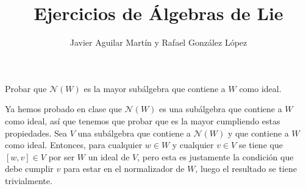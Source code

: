 \documentclass[twoside]{article}
\begin{document}
\title{Ejercicios de Álgebras de Lie}
\author{Javier Aguilar Martín y Rafael González López}
\maketitle

\begin{ejercicio}{1}
	Probar que $\mathcal{N}(W)$ es la mayor subálgebra que contiene a $W$ como ideal.
\end{ejercicio}
\begin{solucion}
		Ya hemos probado en clase que $\mathcal{N}(W)$ es una subálgebra que contiene a $W$ como ideal, así que tenemos que probar que es la mayor cumpliendo estas propiedades. Sea $V$ una subálgebra que contiene a $\mathcal{N}(W)$ y que contiene a $W$ como ideal. Entonces, para cualquier $w\in W$ y cualquier $v\in V$ se tiene que $[w,v]\in V$ por ser $W$ un ideal de $V$, pero esta es justamente la condición que debe cumplir $v$ para estar en el normalizador de $W$, luego el resultado se tiene trivialmente. 
	\end{solucion}



\newpage
\end{document}
